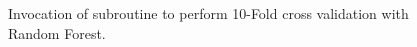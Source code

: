 \begin{figure}[H]
	\centering        {}
	\caption{Invocation of subroutine to perform 10-Fold cross validation with Random Forest.}
	\label{fig:isc}
\end{figure}